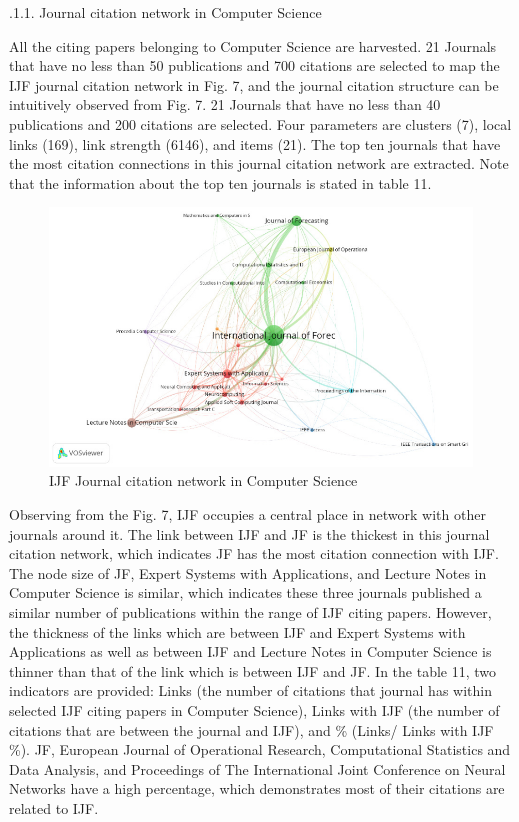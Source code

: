 \documentclass[11pt,a4paper]{elsarticle} %
\begin{document}
.1.1. Journal citation network in Computer Science

All the citing papers belonging to Computer Science are harvested. 21
Journals that have no less than 50 publications and 700 citations are
selected to map the IJF journal citation network in Fig. 7, and the
journal citation structure can be intuitively observed from Fig. 7. 21
Journals that have no less than 40 publications and 200 citations are
selected. Four parameters are clusters (7), local links (169), link
strength (6146), and items (21). The top ten journals that have the most
citation connections in this journal citation network are extracted.
Note that the information about the top ten journals is stated in table
11.

\begin{figure}[htbp]
\centering
\includegraphics[width=\textwidth]{fig.7.eps}
\caption{IJF Journal citation network in Computer Science}
\end{figure}

Observing from the Fig. 7, IJF occupies a central place in network with
other journals around it. The link between IJF and JF is the thickest in
this journal citation network, which indicates JF has the most citation
connection with IJF. The node size of JF, Expert Systems with
Applications, and Lecture Notes in Computer Science is similar, which
indicates these three journals published a similar number of
publications within the range of IJF citing papers. However, the
thickness of the links which are between IJF and Expert Systems with
Applications as well as between IJF and Lecture Notes in Computer
Science is thinner than that of the link which is between IJF and JF. In
the table 11, two indicators are provided: Links (the number of
citations that journal has within selected IJF citing papers in Computer
Science), Links with IJF (the number of citations that are between the
journal and IJF), and \% (Links/ Links with IJF \%). JF, European
Journal of Operational Research, Computational Statistics and Data
Analysis, and Proceedings of The International Joint Conference on
Neural Networks have a high percentage, which demonstrates most of their
citations are related to IJF.
\end{document}

